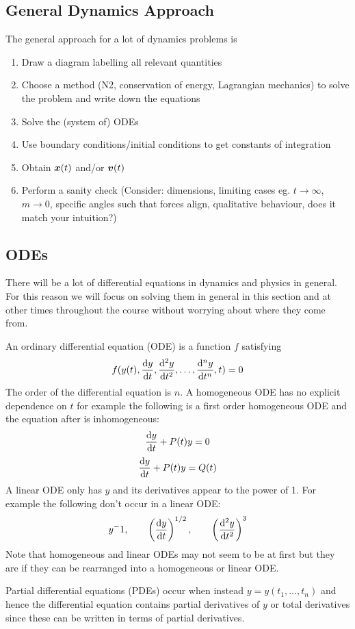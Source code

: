 \documentclass{article}
\begin{document}
    \subsection{General Dynamics Approach}
    The general approach for a lot of dynamics problems is
    \begin{enumerate}
        \item Draw a diagram labelling all relevant quantities
        \item Choose a method (N2, conservation of energy, Lagrangian mechanics) to solve the problem and write down the equations
        \item Solve the (system of) ODEs
        \item Use boundary conditions/initial conditions to get constants of integration
        \item Obtain \(\bm{x}(t)\) and/or \(\bm{v}(t)\)
        \item Perform a sanity check (Consider: dimensions, limiting cases eg. \(t\to\infty\), \(m\to 0\), specific angles such that forces align, qualitative behaviour, does it match your intuition?)
    \end{enumerate}
    
    \subsection{ODEs}
    There will be a lot of differential equations in dynamics and physics in general.
    For this reason we will focus on solving them in general in this section and at other times throughout the course without worrying about where they come from.
    
    An ordinary differential equation (ODE) is a function \(f\) satisfying
    \[f(y(t), \dv{y}{t}, \dv[2]{y}{t},\dotsc ,\dv[n]{y}{t}, t) = 0\]
    The order of the differential equation is \(n\).
    A homogeneous ODE has no explicit dependence on \(t\) for example the following is a first order homogeneous ODE and the equation after is inhomogeneous:
    \[\dv{y}{t} + P(t)y = 0\]
    \[\dv{y}{t} + P(t)y = Q(t)\]
    A linear ODE only has \(y\) and its derivatives appear to the power of 1.
    For example the following don't occur in a linear ODE:
    \[y^-1,\qquad \left(\dv{y}{t}\right)^{1/2},\qquad \left(\dv[2]{y}{t}\right)^3\]
    Note that homogeneous and linear ODEs may not seem to be at first but they are if they can be rearranged into a homogeneous or linear ODE.
    
    Partial differential equations (PDEs) occur when instead \(y = y(t_1, \dotsc, t_n)\) and hence the differential equation contains partial derivatives of \(y\) or total derivatives since these can be written in terms of partial derivatives.
    
\end{document}
